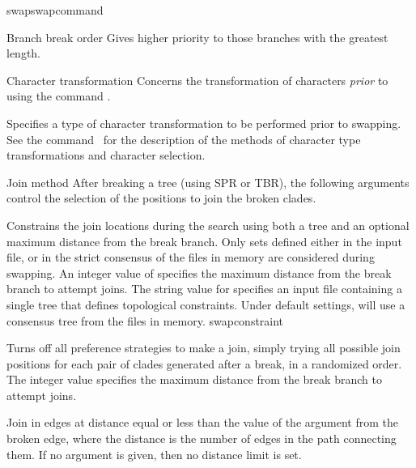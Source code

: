 \begin{command}{swap}{swapcommand}
\begin{arguments}
\begin{argumentgroup}{Branch break order}
{Gives higher priority to those branches with the greatest length.}
{}

\end{argumentgroup}

\begin{argumentgroup}{Character transformation} 
{Concerns the transformation of characters \emph{prior} to using the command 
.}

{Specifies a type of character transformation to be performed
prior to swapping.
See the command~ for
the description of the methods of character type transformations
and character selection.}
{}

\end{argumentgroup}

\begin{argumentgroup}{Join method}
{After breaking a tree (using SPR or TBR), the following 
arguments control the selection of the positions to join the broken
clades.}

{Constrains the join locations during the search
using both a tree and an optional maximum distance from the
break branch. Only sets defined either in the input file, or
in the strict consensus of the files in memory are considered
during swapping. An integer value of 
specifies the maximum distance from the break branch to
attempt joins. The string value for 
specifies an input file containing a single tree that
defines topological constraints. Under default settings,
 will use a consensus tree from the
files in memory.}
{swapconstraint}

{Turns off all preference strategies to make a join, simply trying
all possible join positions for each pair of clades generated
after a break, in a randomized order. The integer value 
specifies the maximum distance from the break branch to
attempt joins.}
{}

{Join in edges at distance equal or less than the value of the argument
from the broken edge, where the distance is the number of edges
in the path connecting them. If no argument is given, then no
distance limit is set.}
{}

\end{argumentgroup}


\end{arguments}
\end{command}
